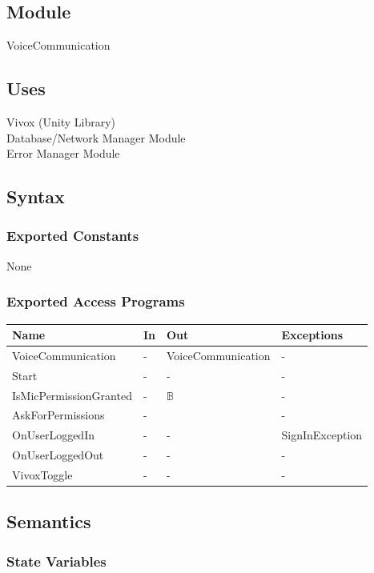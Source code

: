 \documentclass[12pt, titlepage]{article}
\begin{document}
\subsection{Module}
VoiceCommunication

\subsection{Uses}
Vivox (Unity Library)\\
Database/Network Manager Module\\
Error Manager Module

\subsection{Syntax}

\subsubsection{Exported Constants}
None

\subsubsection{Exported Access Programs}

\begin{center}
\begin{tabular}{p{5cm} p{4cm} p{4cm} p{2cm}}
\hline
\textbf{Name} & \textbf{In} & \textbf{Out} & \textbf{Exceptions} \\
\hline
VoiceCommunication & - & VoiceCommunication & - \\
Start & - & - & - \\
IsMicPermissionGranted  & - & $\mathds{B}$ & - \\
AskForPermissions  & - &  & - \\
OnUserLoggedIn  & - & - & SignInException \\
OnUserLoggedOut  & - & - & - \\
VivoxToggle  & - & - & - \\
\hline
\end{tabular}
\end{center}

\subsection{Semantics}

\subsubsection{State Variables}
\end{document}
